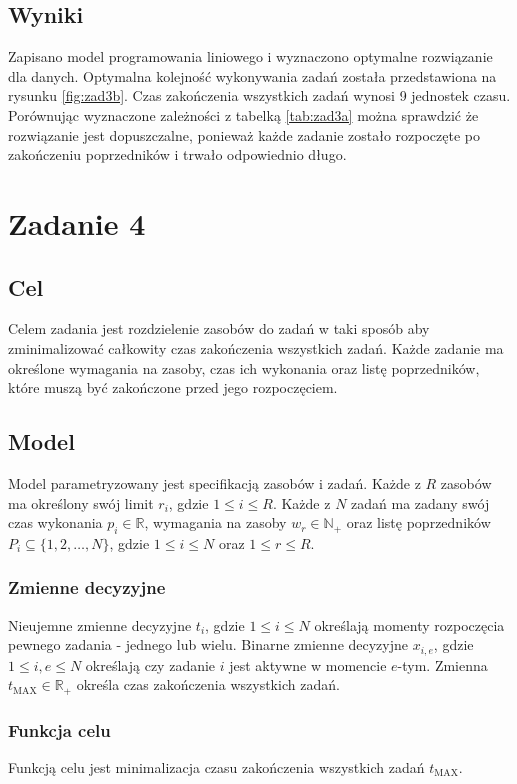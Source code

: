 \documentclass{article}
\begin{document}
\subsection{Wyniki}
Zapisano model programowania liniowego i wyznaczono optymalne rozwiązanie dla danych.
Optymalna kolejność wykonywania zadań została przedstawiona na rysunku \ref{fig:zad3b}.
Czas zakończenia wszystkich zadań wynosi 9 jednostek czasu.
Porównując wyznaczone zależności z tabelką \ref{tab:zad3a} można sprawdzić że rozwiązanie jest dopuszczalne, ponieważ każde zadanie zostało rozpoczęte po zakończeniu poprzedników i trwało odpowiednio długo.

\section{Zadanie 4}
\subsection{Cel}
Celem zadania jest rozdzielenie zasobów do zadań w taki sposób aby zminimalizować całkowity czas zakończenia wszystkich zadań.
Każde zadanie ma określone wymagania na zasoby, czas ich wykonania oraz listę poprzedników, które muszą być zakończone przed jego rozpoczęciem.

\subsection{Model}
Model parametryzowany jest specifikacją zasobów i zadań. Każde z $R$ zasobów ma określony swój limit $r_i$, gdzie $1 \leq i \leq R$.
Każde z $N$ zadań ma zadany swój czas wykonania $p_i \in \mathbb{R}$, wymagania na zasoby $w_{r} \in \mathbb{N}_+$ oraz listę poprzedników $P_i \subseteq \{1,2,\ldots,N\}$, gdzie $1 \leq i \leq N$ oraz $1 \leq r \leq R$.

\subsubsection{Zmienne decyzyjne}
Nieujemne zmienne decyzyjne $t_i$, gdzie $1 \leq i \leq N$ określają momenty rozpoczęcia pewnego zadania - jednego lub wielu.
Binarne zmienne decyzyjne $x_{i,e}$, gdzie $1 \leq i,e \leq N$ określają czy zadanie $i$ jest aktywne w momencie $e$-tym. Zmienna $t_{\mathrm{MAX}} \in \mathbb{R}_+$ określa czas zakończenia wszystkich zadań. 

\subsubsection{Funkcja celu}
Funkcją celu jest minimalizacja czasu zakończenia wszystkich zadań $t_{\mathrm{MAX}}$.
\end{document}
